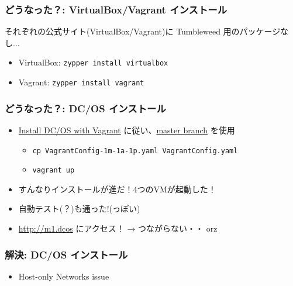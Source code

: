 \documentclass[aspectratio=169,11pt,hyperref={colorlinks=true}]{beamer}
\begin{document}
\begin{frame}
  \frametitle{どうなった？: VirtualBox/Vagrant インストール}
  それぞれの公式サイト(VirtualBox/Vagrant)に Tumbleweed 用のパッケージなし...
  \begin{itemize}
    \item VirtualBox: \lstinline[basicstyle=\ttfamily\footnotesize,columns=fixed]{zypper install virtualbox}
    \item Vagrant: \lstinline[basicstyle=\ttfamily\footnotesize,columns=fixed]{zypper install vagrant}
  \end{itemize}
\end{frame}

\begin{frame}
  \frametitle{どうなった？: DC/OS インストール}
  \begin{itemize}
    \item \href{https://dcos.io/docs/1.9/installing/local/}{Install DC/OS with Vagrant} に従い、\href{https://github.com/dcos/dcos-vagrant/}{master branch} を使用
    \begin{itemize}
      \item \lstinline[basicstyle=\ttfamily\footnotesize,columns=fixed]{cp VagrantConfig-1m-1a-1p.yaml VagrantConfig.yaml}
      \item \lstinline[basicstyle=\ttfamily\footnotesize,columns=fixed]{vagrant up}
    \end{itemize}
    \item すんなりインストールが進だ！4つのVMが起動した！
    \item 自動テスト(？)も通った!(っぽい)
    \item \url{http://m1.dcos} にアクセス！ → つながらない・・ orz
  \end{itemize}
\end{frame}

\begin{frame}
  \frametitle{解決: DC/OS インストール}
  \begin{itemize}
    \item Host-only Networks issue
      
  \end{itemize}
\end{frame}
\end{document}

